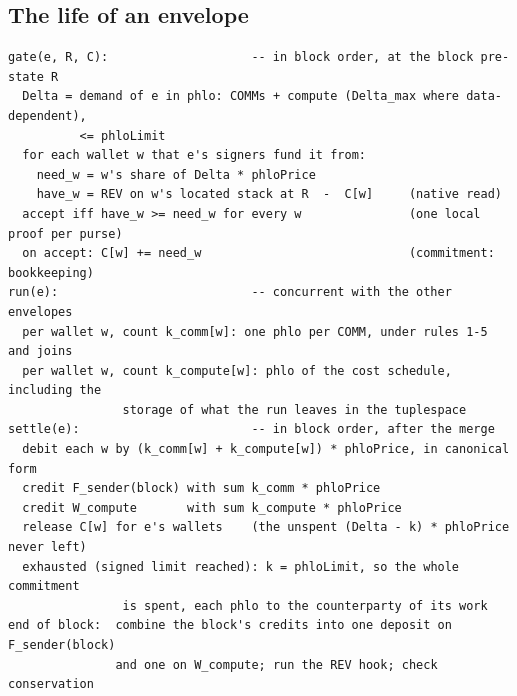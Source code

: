 \documentclass[11pt]{article}
\begin{document}
\subsection{The life of an envelope}

\begin{Verbatim}[fontsize=\footnotesize,frame=single,framesep=6pt]
gate(e, R, C):                    -- in block order, at the block pre-state R
  Delta = demand of e in phlo: COMMs + compute (Delta_max where data-dependent),
          <= phloLimit
  for each wallet w that e's signers fund it from:
    need_w = w's share of Delta * phloPrice
    have_w = REV on w's located stack at R  -  C[w]     (native read)
  accept iff have_w >= need_w for every w               (one local proof per purse)
  on accept: C[w] += need_w                             (commitment: bookkeeping)
run(e):                           -- concurrent with the other envelopes
  per wallet w, count k_comm[w]: one phlo per COMM, under rules 1-5 and joins
  per wallet w, count k_compute[w]: phlo of the cost schedule, including the
                storage of what the run leaves in the tuplespace
settle(e):                        -- in block order, after the merge
  debit each w by (k_comm[w] + k_compute[w]) * phloPrice, in canonical form
  credit F_sender(block) with sum k_comm * phloPrice
  credit W_compute       with sum k_compute * phloPrice
  release C[w] for e's wallets    (the unspent (Delta - k) * phloPrice never left)
  exhausted (signed limit reached): k = phloLimit, so the whole commitment
                is spent, each phlo to the counterparty of its work
end of block:  combine the block's credits into one deposit on F_sender(block)
               and one on W_compute; run the REV hook; check conservation
\end{Verbatim}
\end{document}

